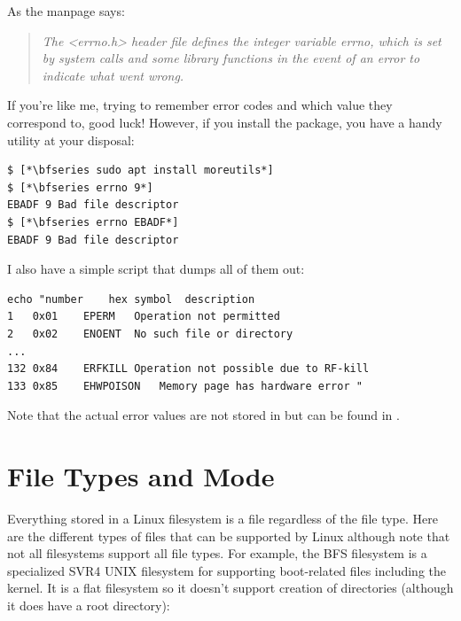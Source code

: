 As the  manpage says:

\begin{quote}
\textit{The  <errno.h> header file defines the integer variable errno, which is set by system calls and some library functions in the event of an error to indicate what went wrong.}
\end{quote}

\noindent       
If you're like me, trying to remember error codes and which  value they correspond to, good luck! However, if you install the  package, you have a handy utility at your disposal:

\begin{lstlisting}
$ [*\bfseries sudo apt install moreutils*]
$ [*\bfseries errno 9*]
EBADF 9 Bad file descriptor
$ [*\bfseries errno EBADF*]
EBADF 9 Bad file descriptor
\end{lstlisting}

\noindent
I also have a simple script that dumps all of them out:

\begin{lstlisting}
echo "number    hex symbol  description
1   0x01    EPERM   Operation not permitted
2   0x02    ENOENT  No such file or directory
...
132 0x84    ERFKILL Operation not possible due to RF-kill
133 0x85    EHWPOISON   Memory page has hardware error "
\end{lstlisting}

\noindent
Note that the actual error values are not stored in  but can be found in .

\section{File Types and Mode}

Everything stored in a Linux filesystem is a file regardless of the file type. Here are the different types of files that can be supported by Linux although note that not all filesystems support all file types. For example, the BFS filesystem is a specialized SVR4 UNIX filesystem for supporting boot-related files including the kernel. It is a flat filesystem so it doesn't support creation of directories (although it does have a root directory):

